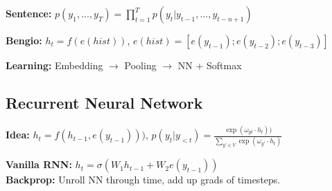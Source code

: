 \textbf{Sentence:} $p(y_1, ..., y_T) = \prod_{t=1}^T p(y_t | y_{t-1}, ..., y_{t-n+1})$\\
\begin{comment}
	If we want to model the joint distribution in a large Vocabulary, the parameters can explode. Assume V=1000 and n=10, we already have $1000^10$ parameters.\\
\end{comment} 

\textbf{Bengio:} $h_t = f(e(hist))$, $e(hist) = [e(y_{t-1}); e(y_{t-2}); e(y_{t-3})]$
\begin{comment}
	We have the e function that places each word from the history in an embedding, and then concatenates them together.
	The concatenation is also called pooling.
	This is then fed into a neural network f, so h = f(e(history)). 
	This output is then used in a softmax to make a distribution, as seen in p(y|...).
	The parameters can be trained by maximizing the log-likelihood through backprop.\\
	Limitation: Fixed context frame!\\
\end{comment} 

\textbf{Learning:} Embedding $\rightarrow$ Pooling $\rightarrow$ NN + Softmax\\

\subsection{Recurrent Neural Network}
\textbf{Idea:} $h_t = f(h_{t-1}, e(y_{t-1})))$, $p(y_t | y_{< t}) = \frac{\exp(\omega_{yt} \cdot h_t))}{\sum_{y' \in V} \exp(\omega_{y'} \cdot h_t)}$\\
\begin{comment}
	We are passing a hidden state $h_{t-1}$ with every $y_{t-1}$ into the network, to generate a new hidden state $h_t$.
	This method implicitly models an infinite context.
	The NN f models how we combine the recurrent (history) part of the model with the embedding of the current input.\\
\end{comment} 


\textbf{Vanilla RNN:} $h_t = \sigma(W_1 h_{t-1} + W_2 e(y_{t-1}))$\\


\textbf{Backprop:} Unroll NN through time, add up grads of timesteps.\\
\begin{comment}
	We unroll the iterations through time. 
	This means, that the same parameters are used multiple times. 
	We get the gradient by adding up the gradients of the parameters of all the timesteps.\\
\end{comment} 














